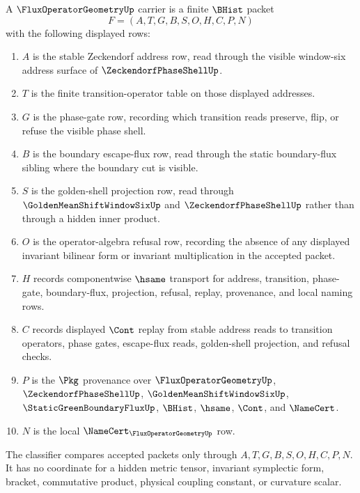 \begin{definition}
\label{def:flux-operator-geometry-carrier}
A $\FluxOperatorGeometryUp$ carrier is a finite $\BHist$ packet
$$
F=(A,T,G,B,S,O,H,C,P,N)
$$
with the following displayed rows:
\begin{enumerate}
\item $A$ is the stable Zeckendorf address row, read through the visible window-six address surface of $\ZeckendorfPhaseShellUp$.
\item $T$ is the finite transition-operator table on those displayed addresses.
\item $G$ is the phase-gate row, recording which transition reads preserve, flip, or refuse the visible phase shell.
\item $B$ is the boundary escape-flux row, read through the static boundary-flux sibling where the boundary cut is visible.
\item $S$ is the golden-shell projection row, read through $\GoldenMeanShiftWindowSixUp$ and $\ZeckendorfPhaseShellUp$ rather than through a hidden inner product.
\item $O$ is the operator-algebra refusal row, recording the absence of any displayed invariant bilinear form or invariant multiplication in the accepted packet.
\item $H$ records componentwise $\hsame$ transport for address, transition, phase-gate, boundary-flux, projection, refusal, replay, provenance, and local naming rows.
\item $C$ records displayed $\Cont$ replay from stable address reads to transition operators, phase gates, escape-flux reads, golden-shell projection, and refusal checks.
\item $P$ is the $\Pkg$ provenance over $\FluxOperatorGeometryUp$, $\ZeckendorfPhaseShellUp$, $\GoldenMeanShiftWindowSixUp$, $\StaticGreenBoundaryFluxUp$, $\BHist$, $\hsame$, $\Cont$, and $\NameCert$.
\item $N$ is the local $\NameCert_{\FluxOperatorGeometryUp}$ row.
\end{enumerate}
The classifier compares accepted packets only through $A,T,G,B,S,O,H,C,P,N$. It has no coordinate for a hidden metric tensor, invariant symplectic form, bracket, commutative product, physical coupling constant, or curvature scalar.
\end{definition}

